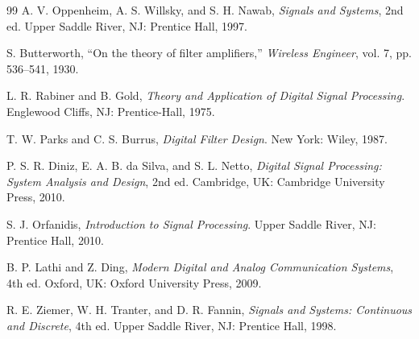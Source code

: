 \documentclass[conference]{IEEEtran}
\begin{document}
\begin{thebibliography}{99}
A. V. Oppenheim, A. S. Willsky, and S. H. Nawab, \textit{Signals and Systems}, 2nd ed. Upper Saddle River, NJ: Prentice Hall, 1997.

S. Butterworth, ``On the theory of filter amplifiers,'' \textit{Wireless Engineer}, vol. 7, pp. 536--541, 1930.

L. R. Rabiner and B. Gold, \textit{Theory and Application of Digital Signal Processing}. Englewood Cliffs, NJ: Prentice-Hall, 1975.

T. W. Parks and C. S. Burrus, \textit{Digital Filter Design}. New York: Wiley, 1987.

P. S. R. Diniz, E. A. B. da Silva, and S. L. Netto, \textit{Digital Signal Processing: System Analysis and Design}, 2nd ed. Cambridge, UK: Cambridge University Press, 2010.

S. J. Orfanidis, \textit{Introduction to Signal Processing}. Upper Saddle River, NJ: Prentice Hall, 2010.

B. P. Lathi and Z. Ding, \textit{Modern Digital and Analog Communication Systems}, 4th ed. Oxford, UK: Oxford University Press, 2009.

R. E. Ziemer, W. H. Tranter, and D. R. Fannin, \textit{Signals and Systems: Continuous and Discrete}, 4th ed. Upper Saddle River, NJ: Prentice Hall, 1998.

\end{thebibliography}
\end{document}
